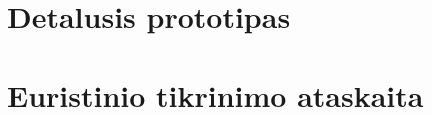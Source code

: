   

  \section{Detalusis prototipas}
  

  \newpage
  \section{Euristinio tikrinimo ataskaita}
  

\newpage
{}


